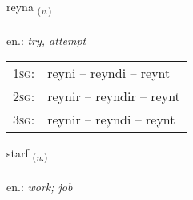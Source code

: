 \documentclass[frontgrid, backgrid]{flacards}\usepackage[]{graphicx}\usepackage[]{xcolor}
\begin{document}
\renewcommand{\flhead}{\vskip5pt \fboxsep=0pt {\small\bfseries\footnotesize Sagnorð | Verb}}
\renewcommand{\fcfoot}{\vskip5pt \fboxsep=0pt \hspace{2pt}{\small\bfseries\footnotesize 1K}}

\renewcommand{\blhead}{\vskip5pt {\small\bfseries\footnotesize Sagnorð | Verb }}
\renewcommand{\bcfoot}{\vskip5pt \hspace{2pt}{\small\bfseries\footnotesize 1K}}


{reyna \small{\textsubscript{(\textit{v.})}} \\[1ex] %
\textphonetic{[reiːna]} \\
en.: \emph{try, attempt} \\  [2ex]
\renewcommand*{\arraystretch}{0.8}
\begin{tabular}{p{1cm}l}
\textsc{1sg}: & reyni -- reyndi -- reynt \\ 
\textsc{2sg}: & reynir -- reyndir -- reynt \\ 
\textsc{3sg}: & reynir -- reyndi -- reynt \\ 
\end{tabular}
}

\renewcommand{\flhead}{\vskip5pt \fboxsep=0pt {\small\bfseries\footnotesize Nafnorð | Noun}}
\renewcommand{\fcfoot}{\vskip5pt \fboxsep=0pt \hspace{2pt}{\small\bfseries\footnotesize 1K}}

\renewcommand{\blhead}{\vskip5pt {\small\bfseries\footnotesize Nafnorð | Noun }}
\renewcommand{\bcfoot}{\vskip5pt \hspace{2pt}{\small\bfseries\footnotesize 1K}}


{starf \small{\textsubscript{(\textit{n.})}} \\[1ex] %
\textphonetic{[starv]} \\
en.: \emph{work; job} \\  [2ex]
\renewcommand*{\arraystretch}{0.8}
}
\end{document}
